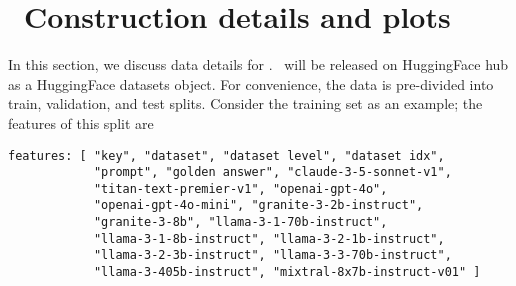 



\section{\newdata\ Construction details and plots}\label{sec:append:sprout}
In this section, we discuss data details for \newdata. \newdata\ will be released on HuggingFace hub as a HuggingFace datasets object. For convenience, the data is pre-divided into train, validation, and test splits. Consider the training set as an example; the features of this split are

\begin{tcolorbox}[
    title=Features of each split of \newdata,
    breakable,
    colback=gray!5,
    colframe=gray!70
]
\begin{verbatim}
features: [ "key", "dataset", "dataset level", "dataset idx", 
            "prompt", "golden answer", "claude-3-5-sonnet-v1", 
            "titan-text-premier-v1", "openai-gpt-4o", 
            "openai-gpt-4o-mini", "granite-3-2b-instruct", 
            "granite-3-8b", "llama-3-1-70b-instruct", 
            "llama-3-1-8b-instruct", "llama-3-2-1b-instruct", 
            "llama-3-2-3b-instruct", "llama-3-3-70b-instruct", 
            "llama-3-405b-instruct", "mixtral-8x7b-instruct-v01" ]
\end{verbatim}
\end{tcolorbox}





